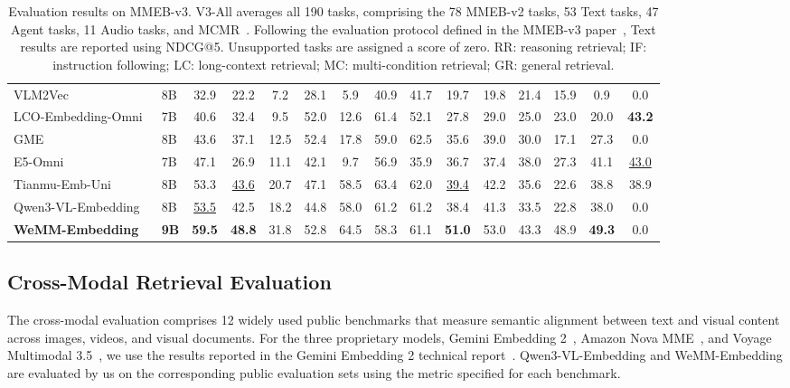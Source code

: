\documentclass[]{wechat}
\begin{document}
\begin{table}[t]
{\begin{tabular}{ll c cccccc cccc cc}
VLM2Vec~\cite{vlm2vec2024}
& 8B & 32.9
& 22.2 & 7.2 & 28.1 & 5.9 & 40.9 & 41.7
& 19.7 & 19.8 & 21.4 & 15.9
& 0.9 & 0.0 \\

LCO-Embedding-Omni~\cite{lco-embedding}
& 7B & 40.6
& 32.4 & 9.5 & 52.0 & 12.6 & 61.4 & 52.1
& 27.8 & 29.0 & 25.0 & 23.0
& 20.0 & \textbf{43.2} \\

GME~\cite{zhang2024gme}
& 8B & 43.6
& 37.1 & 12.5 & 52.4 & 17.8 & 59.0 & 62.5
& 35.6 & 39.0 & 30.0 & 17.1
& 27.3 & 0.0 \\

E5-Omni~\cite{e5-omni}
& 7B & 47.1
& 26.9 & 11.1 & 42.1 & 9.7 & 56.9 & 35.9
& 36.7 & 37.4 & 38.0 & 27.3
& 41.1 & \underline{43.0} \\

Tianmu-Emb-Uni
& 8B & 53.3
& \underline{43.6} & 20.7 & 47.1 & 58.5 & 63.4 & 62.0
& \underline{39.4} & 42.2 & 35.6 & 22.6
& 38.8 & 38.9 \\

Qwen3-VL-Embedding~\cite{qwen3vl-emb}
& 8B & \underline{53.5}
& 42.5 & 18.2 & 44.8 & 58.0 & 61.2 & 61.2
& 38.4 & 41.3 & 33.5 & 22.8
& 38.0 & 0.0 \\

\rowcolor{gray!10}
\textbf{WeMM-Embedding}
& \textbf{9B} & \textbf{59.5}
& \textbf{48.8} & 31.8 & 52.8 & 64.5 & 58.3 & 61.1
& \textbf{51.0} & 53.0 & 43.3 & 48.9
& \textbf{49.3} & 0.0 \\

\bottomrule
\end{tabular}%
}
\caption{Evaluation results on MMEB-v3. V3-All averages all 190 tasks, comprising the 78 MMEB-v2 tasks, 53 Text tasks, 47 Agent tasks, 11 Audio tasks, and MCMR~\cite{chow2026merit}. Following the evaluation protocol defined in the MMEB-v3 paper~\cite{mmeb-v3}, Text results are reported using NDCG@5. Unsupported tasks are assigned a score of zero. RR: reasoning retrieval; IF: instruction following; LC: long-context retrieval; MC: multi-condition retrieval; GR: general retrieval.}
\label{tab:mmeb_v3}
\end{table}



\subsection{Cross-Modal Retrieval Evaluation}
\label{subsec:cross_modal_retrieval}

The cross-modal evaluation comprises 12 widely used public benchmarks that measure semantic alignment between text and visual content across images, videos, and visual documents. For the three proprietary models, Gemini Embedding 2~\cite{gemini-emb-2}, Amazon Nova MME~\cite{amazon-nova-mme}, and Voyage Multimodal 3.5~\cite{voyage3.5}, we use the results reported in the Gemini Embedding 2 technical report~\cite{gemini-emb-2}. Qwen3-VL-Embedding and WeMM-Embedding are evaluated by us on the corresponding public evaluation sets using the metric specified for each benchmark.
\end{document}

